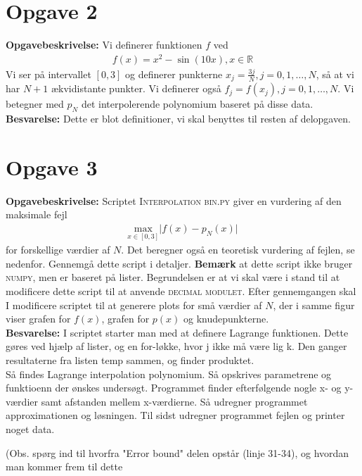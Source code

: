 \section*{Opgave 2}
\textbf{Opgavebeskrivelse:} Vi definerer funktionen $f$ ved
\begin{align*}
f(x)=x^2-\sin(10x), x \in \mathbb{R}
\end{align*}
Vi ser på intervallet $\left [0,3 \right ]$ og definerer punkterne $x_j = \frac{3j}{N}, j = 0, 1, \ldots, N$, så at vi har $N+1$ ækvidistante punkter. Vi definerer også $f_j=f(x_j), j=0,1,\ldots,N.$ Vi betegner med $p_N$ det interpolerende polynomium baseret på disse data.  
\\
\textbf{Besvarelse:} Dette er blot definitioner, vi skal benyttes til resten af delopgaven. 
\section*{Opgave 3}
\textbf{Opgavebeskrivelse:} Scriptet \textsc{Interpolation bin.py} giver en vurdering af den maksimale fejl 
\begin{align*}
\underset{x \in \left [0,3 \right ]}{\text{max}} \lvert f(x)-p_N(x) \rvert
\end{align*}
for forskellige værdier af $N$. Det beregner også en teoretisk vurdering af fejlen, se nedenfor. Gennemgå dette script i detaljer. \textbf{Bemærk} at dette script ikke bruger \textsc{numpy}, men er baseret på lister. Begrundelsen er at vi skal være i stand til at modificere dette script til at anvende \textsc{decimal modulet}. Efter gennemgangen skal I modificere scriptet til at generere plots for små værdier af $N$, der i samme figur viser grafen for $f(x)$, grafen for $p(x)$ og knudepunkterne.
\\
\textbf{Besvarelse:} I scriptet starter man med at definere Lagrange funktionen. Dette gøres ved hjælp af lister, og en for-løkke, hvor j ikke må være lig k. Den ganger resultaterne fra listen temp sammen, og finder produktet.\\
Så findes Lagrange interpolation polynomium. Så opskrives parametrene og funktioenn der ønskes undersøgt. Programmet finder efterfølgende nogle x- og y-værdier samt afstanden mellem x-værdierne. Så udregner programmet approximationen og løsningen. Til sidst udregner programmet fejlen og printer noget data. 

(Obs. spørg ind til hvorfra "Error bound" delen opstår (linje 31-34), og hvordan man kommer frem til dette 

